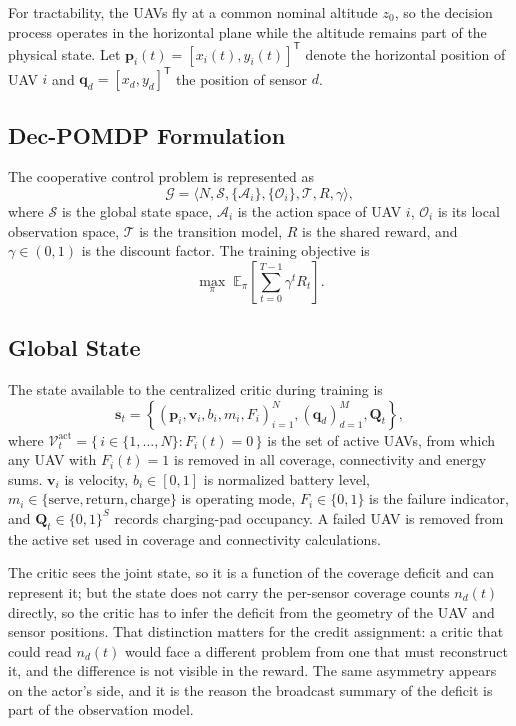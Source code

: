 \documentclass[conference]{IEEEtran}
\begin{document}
For tractability, the UAVs fly at a common nominal altitude $z_0$, so the decision process operates in the horizontal plane while the altitude remains part of the physical state. Let $\mathbf p_i(t)=[x_i(t),y_i(t)]^\mathsf{T}$ denote the horizontal position of UAV $i$ and $\mathbf q_d=[x_d,y_d]^\mathsf{T}$ the position of sensor $d$.

\subsection{Dec-POMDP Formulation}
The cooperative control problem is represented as
\begin{equation}
\mathcal G=\langle N,\mathcal S,\{\mathcal A_i\},\{\mathcal O_i\},\mathcal T, R,\gamma\rangle,
\label{eq:decpomdp}
\end{equation}
where $\mathcal S$ is the global state space, $\mathcal A_i$ is the action space of UAV $i$, $\mathcal O_i$ is its local observation space, $\mathcal T$ is the transition model, $R$ is the shared reward, and $\gamma\in(0,1)$ is the discount factor. The training objective is
\begin{equation}
\max_{\pi}\;\mathbb E_{\pi}\left[\sum_{t=0}^{T-1}\gamma^t R_t\right].
\label{eq:objective}
\end{equation}

\subsection{Global State}
The state available to the centralized critic during training is
\begin{equation}
\mathbf s_t=\left\{(\mathbf p_i,\mathbf v_i,b_i,m_i,F_i)_{i=1}^{N},(\mathbf q_d)_{d=1}^{M},\mathbf Q_t\right\},
\label{eq:state}
\end{equation}
where $\mathcal{V}_t^{\mathrm{act}}=\{\,i\in\{1,\dots,N\}:F_i(t)=0\,\}$ is the set of active UAVs, from which any UAV with $F_i(t)=1$ is removed in all coverage, connectivity and energy sums. $\mathbf v_i$ is velocity, $b_i\in[0,1]$ is normalized battery level, $m_i\in\{\mathrm{serve},\mathrm{return},\mathrm{charge}\}$ is operating mode, $F_i\in\{0,1\}$ is the failure indicator, and $\mathbf Q_t\in\{0,1\}^{S}$ records charging-pad occupancy. A failed UAV is removed from the active set used in coverage and connectivity calculations.

The critic sees the joint state, so it is a function of the coverage deficit and can represent it; but the state does not carry the per-sensor coverage counts $n_d(t)$ directly, so the critic has to infer the deficit from the geometry of the UAV and sensor positions. That distinction matters for the credit assignment: a critic that could read $n_d(t)$ would face a different problem from one that must reconstruct it, and the difference is not visible in the reward. The same asymmetry appears on the actor's side, and it is the reason the broadcast summary of the deficit is part of the observation model.
\end{document}
